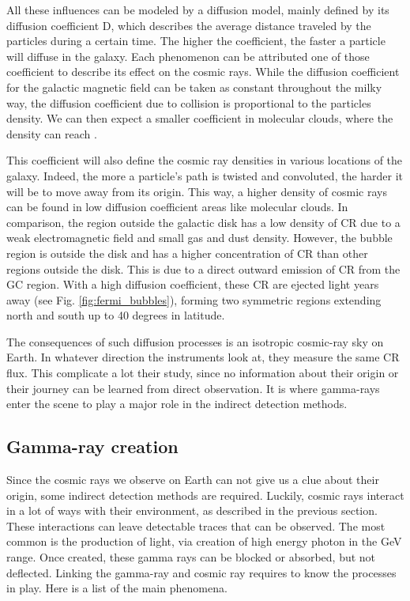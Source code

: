 All these influences can be modeled by a diffusion model, mainly defined by its diffusion coefficient D, which describes the average distance traveled by the particles during a certain time. The higher the coefficient, the faster a particle will diffuse in the galaxy. Each phenomenon can be attributed one of those coefficient to describe its effect on the cosmic rays. 
While the diffusion coefficient for the galactic magnetic field can be taken as constant throughout the milky way, the diffusion coefficient due to collision is proportional to the particles density. We can then expect a smaller coefficient in molecular clouds, where the density can reach .

This coefficient will also define the cosmic ray densities in various locations of the galaxy. Indeed, the more a particle's path is twisted and convoluted, the harder it will be to move away from its origin. This way, a higher density of cosmic rays can be found in low diffusion coefficient areas like molecular clouds. In comparison, the region outside the galactic disk has a low density of CR due to a weak electromagnetic field and small gas and dust density. However, the bubble region is outside the disk and has a higher concentration of CR than other regions outside the disk. This is due to a direct outward emission of CR from the GC region. With a high diffusion coefficient, these CR are ejected light years away (see Fig. \ref{fig:fermi_bubbles}), forming two symmetric regions extending north and south up to 40 degrees in latitude.

The consequences of such diffusion processes is an isotropic cosmic-ray sky on Earth. In whatever direction the instruments look at, they measure the same CR flux. This complicate a lot their study, since no information about their origin or their journey can be learned from direct observation. It is where gamma-rays enter the scene to play a major role in the indirect detection methods.

\subsection{Gamma-ray creation}

Since the cosmic rays we observe on Earth can not give us a clue about their origin, some indirect detection methods are required. Luckily, cosmic rays interact in a lot of ways with their environment, as described in the previous section. These interactions can leave detectable traces that can be observed. The most common is the production of light, via creation of high energy photon in the GeV range. Once created, these gamma rays can be blocked or absorbed, but not deflected. Linking the gamma-ray and cosmic ray requires to know the processes in play. Here is a list of the main phenomena.

